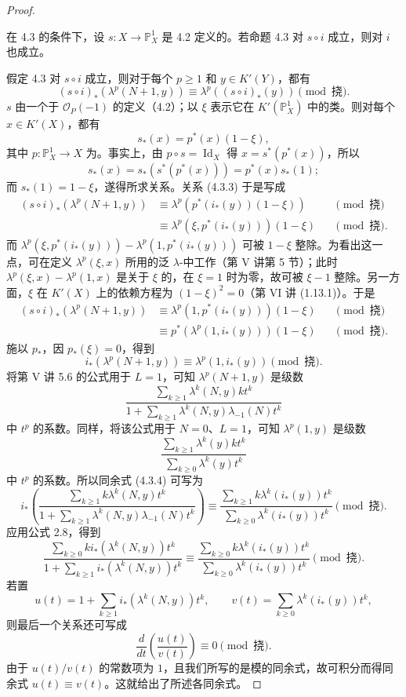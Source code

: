 \begin{proof}
\begin{SGAresult}{}{}
在 4.3 的条件下，设 $s:X\to\mathbb P_X^1$ 是 4.2 定义的。若命题 4.3 对 $s\circ i$ 成立，则对 $i$ 也成立。
\end{SGAresult}
假定 4.3 对 $s\circ i$ 成立，则对于每个 $p\geq1$ 和 $y\in K'(Y)$，都有
\[
(s\circ i)_*(\lambda^p(N+1,y))\equiv\lambda^p((s\circ i)_*(y))\pmod{\text{挠}}.\tag{4.3.3}
\]
 $s$ 由一个于 $\mathcal O_P(-1)$ 的定义（4.2）；以 $\xi$ 表示它在 $K'(\mathbb P_X^1)$ 中的类。则对每个 $x\in K'(X)$，都有
\[
s_*(x)=p^*(x)(1-\xi),
\]
其中 $p:\mathbb P_X^1\to X$ 为。事实上，由 $p\circ s=\operatorname{Id}_X$ 得 $x=s^*(p^*(x))$，所以
\[
s_*(x)=s_*(s^*(p^*(x)))=p^*(x)s_*(1);
\]
而 $s_*(1)=1-\xi$，遂得所求关系。关系 (4.3.3) 于是写成
\[
\begin{aligned}
(s\circ i)_*(\lambda^p(N+1,y))
&\equiv\lambda^p(p^*(i_*(y))(1-\xi))&&\pmod{\text{挠}}\\
&\equiv\lambda^p(\xi,p^*(i_*(y)))(1-\xi)&&\pmod{\text{挠}}.
\end{aligned}
\]
而 $\lambda^p(\xi,p^*(i_*(y)))-\lambda^p(1,p^*(i_*(y)))$ 可被 $1-\xi$ 整除。为看出这一点，可在定义 $\lambda^p(\xi,x)$ 所用的泛 $\lambda$-中工作（第 V 讲第 5 节）；此时 $\lambda^p(\xi,x)-\lambda^p(1,x)$ 是关于 $\xi$ 的，在 $\xi=1$ 时为零，故可被 $\xi-1$ 整除。另一方面，$\xi$ 在 $K'(X)$ 上的依赖方程为 $(1-\xi)^2=0$（第 VI 讲 (1.13.1)）。于是
\[
\begin{aligned}
(s\circ i)_*(\lambda^p(N+1,y))
&\equiv\lambda^p(1,p^*(i_*(y)))(1-\xi)&&\pmod{\text{挠}}\\
&\equiv p^*(\lambda^p(1,i_*(y)))(1-\xi)&&\pmod{\text{挠}}.
\end{aligned}
\]
施以 $p_*$，因 $p_*(\xi)=0$，得到
\[
i_*(\lambda^p(N+1,y))\equiv\lambda^p(1,i_*(y))\pmod{\text{挠}}.\tag{4.3.4}
\]
将第 V 讲 5.6 的公式用于 $L=1$，可知 $\lambda^p(N+1,y)$ 是级数
\[
\frac{\displaystyle\sum_{k\geq1}\lambda^k(N,y)kt^k}
{\displaystyle1+\sum_{k\geq1}\lambda^k(N,y)\lambda_{-1}(N)t^k}
\]
中 $t^p$ 的系数。同样，将该公式用于 $N=0$、$L=1$，可知 $\lambda^p(1,y)$ 是级数
\[
\frac{\displaystyle\sum_{k\geq1}\lambda^k(y)kt^k}
{\displaystyle\sum_{k\geq0}\lambda^k(y)t^k}
\]
中 $t^p$ 的系数。所以同余式 (4.3.4) 可写为
\[
i_*\left(\frac{\displaystyle\sum_{k\geq1}k\lambda^k(N,y)t^k}
{\displaystyle1+\sum_{k\geq1}\lambda^k(N,y)\lambda_{-1}(N)t^k}\right)
\equiv\frac{\displaystyle\sum_{k\geq1}k\lambda^k(i_*(y))t^k}
{\displaystyle\sum_{k\geq0}\lambda^k(i_*(y))t^k}\pmod{\text{挠}}.
\]
应用公式 2.8，得到
\[
\frac{\displaystyle\sum_{k\geq0}ki_*(\lambda^k(N,y))t^k}
{\displaystyle1+\sum_{k\geq1}i_*(\lambda^k(N,y))t^k}
\equiv\frac{\displaystyle\sum_{k\geq0}k\lambda^k(i_*(y))t^k}
{\displaystyle\sum_{k\geq0}\lambda^k(i_*(y))t^k}\pmod{\text{挠}}.
\]
若置
\[
u(t)=1+\sum_{k\geq1}i_*(\lambda^k(N,y))t^k,\qquad
v(t)=\sum_{k\geq0}\lambda^k(i_*(y))t^k,
\]
则最后一个关系还可写成
\[
\frac{d}{dt}\left(\frac{u(t)}{v(t)}\right)\equiv0\pmod{\text{挠}}.
\]
由于 $u(t)/v(t)$ 的常数项为 $1$，且我们所写的是模的同余式，故可积分而得同余式 $u(t)\equiv v(t)$。这就给出了所述各同余式。
\end{proof}

